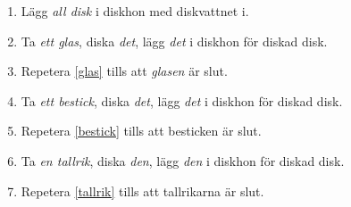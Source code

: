 \begin{frame}
  \begin{example}
    \begin{enumerate}
      \item \alert{Lägg} \emph{all disk} i diskhon med diskvattnet i.
      \item \label{glas} \alert{Ta} \emph{ett glas}, \alert{diska} \emph{det}, 
        \alert{lägg} \emph{det} i diskhon för diskad disk.
      \item Repetera \ref{glas} tills att \emph{glasen} är slut.
      \item \label{bestick} \alert{Ta} \emph{ett bestick}, \alert{diska} 
        \emph{det}, \alert{lägg} \emph{det} i diskhon för diskad disk.
      \item Repetera \ref{bestick} tills att besticken är slut.
      \item \label{tallrik} \alert{Ta} \emph{en tallrik}, \alert{diska} 
        \emph{den}, \alert{lägg} \emph{den} i diskhon för diskad disk.
      \item Repetera \ref{tallrik} tills att tallrikarna är slut.
    \end{enumerate}
  \end{example}
\end{frame}


